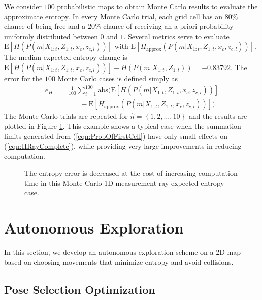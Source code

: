 \documentclass[letterpaper, 10pt, conference]{ieeeconf}
\newcommand{\braces}[1]{\ensuremath{\left\{ #1 \right\}}}
\newcommand{\refeqn}[1]{(\ref{eqn:#1})}
\begin{document}
We consider $100$ probabilistic maps to obtain Monte Carlo results to evaluate the approximate entropy. In every Monte Carlo trial, each grid cell has an $80\%$ chance of being free and a $20\%$ chance of receiving an a priori probability uniformly distributed between $0$ and $1$. 
Several metrics serve to evaluate $\text{E}[H(P(m|X_{1:t},Z_{1:t},x_c,z_{c,l}))]$ with $\text{E}[H_\text{approx}(P(m|X_{1:t},Z_{1:t},x_c,z_{c,l}))]$. The median expected entropy change is $\text{E}[H(P(m|X_{1:t},Z_{1:t},x_c,z_{c,l}))]-H(P(m|X_{1:t},Z_{1:t}))=-0.83792$. The error for the $100$ Monte Carlo cases is defined simply as
\begin{align}
e_{H}&=\frac1{100}\sum_{i=1}^{100}\text{abs}\bigg(\text{E}[H(P(m|X_{1:t},Z_{1:t},x_c,z_{c,l}))]\nonumber\\&\qquad\quad-\text{E}[H_\text{approx}(P(m|X_{1:t},Z_{1:t},x_c,z_{c,l}))]\bigg).
\end{align}
The Monte Carlo trials are repeated for $\hat n=\braces{1,2,\ldots,10}$ and the results are plotted in Figure \ref{fig:ApproxJust}.
This example shows a typical case when the summation limits generated from \refeqn{ProbOfFirstCell} have only small effects on \refeqn{HRayComplete}, while providing very large improvements in reducing computation.

\begin{figure}
\centerline{
}
\caption{The entropy error is decreased at the cost of increasing computation time in this Monte Carlo 1D measurement ray expected entropy case.}
\label{fig:ApproxJust}
\end{figure}



\section{Autonomous Exploration}

In this section, we develop an autonomous exploration scheme on a 2D map based on choosing movements that minimize entropy and avoid collisions.

\subsection{Pose Selection Optimization}
\end{document}
